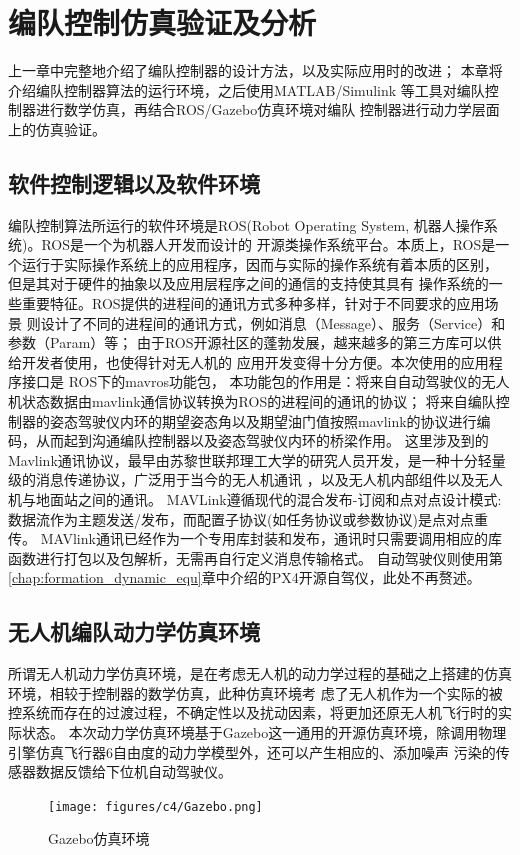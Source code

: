 \chapter{编队控制仿真验证及分析}
\label{chap:hardware}
上一章中完整地介绍了编队控制器的设计方法，以及实际应用时的改进；
本章将介绍编队控制器算法的运行环境，之后使用MATLAB/Simulink
等工具对编队控制器进行数学仿真，再结合ROS/Gazebo仿真环境对编队
控制器进行动力学层面上的仿真验证。
\section{ 软件控制逻辑以及软件环境 }
编队控制算法所运行的软件环境是ROS(Robot Operating System, 机器人操作系统)。ROS是一个为机器人开发而设计的
开源类操作系统平台。本质上，ROS是一个运行于实际操作系统上的应用程序，因而与实际的操作系统有着本质的区别，
但是其对于硬件的抽象以及应用层程序之间的通信的支持使其具有
操作系统的一些重要特征。ROS提供的进程间的通讯方式多种多样，针对于不同要求的应用场景
则设计了不同的进程间的通讯方式，例如消息（Message）、服务（Service）和参数（Param）等；
由于ROS开源社区的蓬勃发展，越来越多的第三方库可以供给开发者使用，也使得针对无人机的
应用开发变得十分方便。本次使用的应用程序接口是
ROS下的mavros功能包，
本功能包的作用是：将来自自动驾驶仪的无人机状态数据由mavlink通信协议转换为ROS的进程间的通讯的协议；
将来自编队控制器的姿态驾驶仪内环的期望姿态角以及期望油门值按照mavlink的协议进行编码，从而起到沟通编队控制器以及姿态驾驶仪内环的桥梁作用。
这里涉及到的Mavlink通讯协议，最早由苏黎世联邦理工大学的研究人员开发，是一种十分轻量级的消息传递协议，广泛用于当今的无人机通讯
，以及无人机内部组件以及无人机与地面站之间的通讯。
MAVLink遵循现代的混合发布-订阅和点对点设计模式:数据流作为主题发送/发布，而配置子协议(如任务协议或参数协议)是点对点重传。
MAVlink通讯已经作为一个专用库封装和发布，通讯时只需要调用相应的库函数进行打包以及包解析，无需再自行定义消息传输格式。
自动驾驶仪则使用第\ref{chap:formation_dynamic_equ}章中介绍的PX4开源自驾仪，此处不再赘述。
\section{无人机编队动力学仿真环境}
所谓无人机动力学仿真环境，是在考虑无人机的动力学过程的基础之上搭建的仿真环境，相较于控制器的数学仿真，此种仿真环境考
虑了无人机作为一个实际的被控系统而存在的过渡过程，不确定性以及扰动因素，将更加还原无人机飞行时的实际状态。
本次动力学仿真环境基于Gazebo这一通用的开源仿真环境，除调用物理引擎仿真飞行器6自由度的动力学模型外，还可以产生相应的、添加噪声
污染的传感器数据反馈给下位机自动驾驶仪。
\begin{figure}[H]
    \centering
    \texttt{[image: figures/c4/Gazebo.png]}
    \caption{Gazebo仿真环境}\label{fig:c4-Gazebo}
\end{figure}

